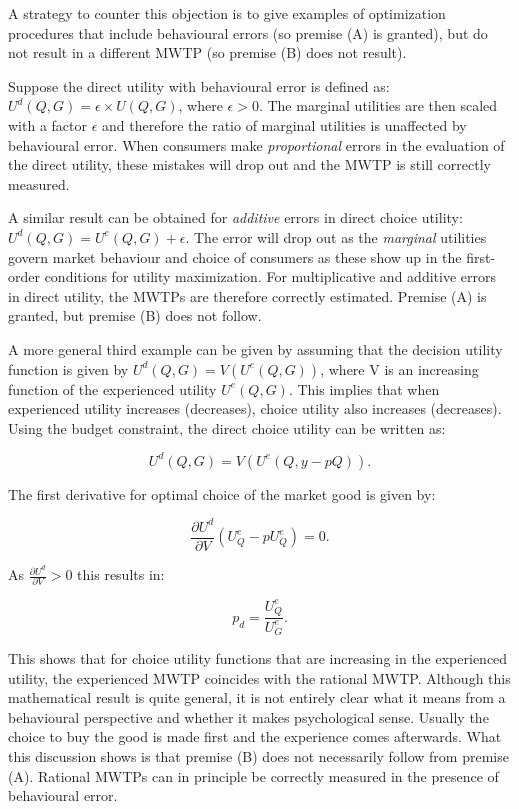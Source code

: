 \documentclass[
]{book}
\begin{document}
A strategy to counter this objection is to give examples of optimization procedures that include behavioural errors (so premise (A) is granted), but do not result in a different MWTP (so premise (B) does not result).

Suppose the direct utility with behavioural error is defined as: \(U^d(Q,G)=\epsilon \times U(Q,G)\), where \(\epsilon > 0\). The marginal utilities are then scaled with a factor \(\epsilon\) and therefore the ratio of marginal utilities is unaffected by behavioural error. When consumers make \emph{proportional} errors in the evaluation of the direct utility, these mistakes will drop out and the MWTP is still correctly measured.

A similar result can be obtained for \emph{additive} errors in direct choice utility: \(U^d (Q,G)=U^e (Q,G)+ \epsilon\). The error will drop out as the \emph{marginal} utilities govern market behaviour and choice of consumers as these show up in the first-order conditions for utility maximization. For multiplicative and additive errors in direct utility, the MWTPs are therefore correctly estimated. Premise (A) is granted, but premise (B) does not follow.

A more general third example can be given by assuming that the decision utility function is given by \(U^d (Q,G)=V(U^e (Q,G))\), where V is an increasing function of the experienced utility \(U^e (Q,G)\). This implies that when experienced utility increases (decreases), choice utility also increases (decreases). Using the budget constraint, the direct choice utility can be written as:

\begin{equation}
U^d (Q,G)=V(U^e (Q, y - pQ)).
\end{equation}

The first derivative for optimal choice of the market good is given by:

\begin{equation}
\frac{\partial U^d}{\partial V}(U^e_Q - pU^e_Q) = 0.
\end{equation}

As \(\frac{\partial U^d}{\partial V} > 0\) this results in:

\begin{equation}
p_d = \frac{U_Q^e}{U_G^e}.
\label{eq:focutility}
\end{equation}

This shows that for choice utility functions that are increasing in the experienced utility, the experienced MWTP coincides with the rational MWTP. Although this mathematical result is quite general, it is not entirely clear what it means from a behavioural perspective and whether it makes psychological sense. Usually the choice to buy the good is made first and the experience comes afterwards.
What this discussion shows is that premise (B) does not necessarily follow from premise (A). Rational MWTPs can in principle be correctly measured in the presence of behavioural error.
\end{document}
